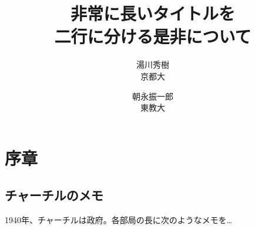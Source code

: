 \documentclass{jlreq}
\begin{document}
\title{非常に長いタイトルを \\ 二行に分ける是非について}
\author{湯川秀樹\\ 京都大 \and 朝永振一郎 \\ 東教大} 
\maketitle

\section{序章}
\subsection{チャーチルのメモ}
 1940年、チャーチルは政府。各部局の長に次のようなメモを…
\end{document}
